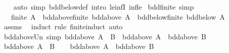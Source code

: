 \begin{isabellebody}
%
\isadelimproof
\ \ %
\endisadelimproof
%
\isatagproof
{}\isamarkupfalse%
\ {\isacharparenleft}{\kern0pt}auto\ simp{\isacharcolon}{\kern0pt}\ bdd{\isacharunderscore}{\kern0pt}below{\isacharunderscore}{\kern0pt}def\ intro{\isacharcolon}{\kern0pt}\ le{\isacharunderscore}{\kern0pt}infI{}\ inf{\isacharunderscore}{\kern0pt}le{}{\isacharparenright}{\kern0pt}%
\endisatagproof
{\isafoldproof}%
%
\isadelimproof
\isanewline
%
\endisadelimproof
\isanewline
{}\isamarkupfalse%
\ bdd{\isacharunderscore}{\kern0pt}finite\ {\isacharbrackleft}{\kern0pt}simp{\isacharbrackright}{\kern0pt}{\isacharcolon}{\kern0pt}\isanewline
\ \ \ {\isachardoublequoteopen}finite\ A{\isachardoublequoteclose}\ \ bdd{\isacharunderscore}{\kern0pt}above{\isacharunderscore}{\kern0pt}finite{\isacharcolon}{\kern0pt}\ {\isachardoublequoteopen}bdd{\isacharunderscore}{\kern0pt}above\ A{\isachardoublequoteclose}\ \ bdd{\isacharunderscore}{\kern0pt}below{\isacharunderscore}{\kern0pt}finite{\isacharcolon}{\kern0pt}\ {\isachardoublequoteopen}bdd{\isacharunderscore}{\kern0pt}below\ A{\isachardoublequoteclose}\isanewline
%
\isadelimproof
\ \ %
\endisadelimproof
%
\isatagproof
{}\isamarkupfalse%
\ assms\ \isamarkupfalse%
\ {\isacharparenleft}{\kern0pt}induct\ rule{\isacharcolon}{\kern0pt}\ finite{\isacharunderscore}{\kern0pt}induct{\isacharcomma}{\kern0pt}\ auto{\isacharparenright}{\kern0pt}%
\endisatagproof
{\isafoldproof}%
%
\isadelimproof
\isanewline
%
\endisadelimproof
\isanewline
{}\isamarkupfalse%
\ bdd{\isacharunderscore}{\kern0pt}above{\isacharunderscore}{\kern0pt}Un\ {\isacharbrackleft}{\kern0pt}simp{\isacharbrackright}{\kern0pt}{\isacharcolon}{\kern0pt}\ {\isachardoublequoteopen}bdd{\isacharunderscore}{\kern0pt}above\ {\isacharparenleft}{\kern0pt}A\ {\isasymunion}\ B{\isacharparenright}{\kern0pt}\ {\isacharequal}{\kern0pt}\ {\isacharparenleft}{\kern0pt}bdd{\isacharunderscore}{\kern0pt}above\ A\ {\isasymand}\ bdd{\isacharunderscore}{\kern0pt}above\ B{\isacharparenright}{\kern0pt}{\isachardoublequoteclose}\isanewline
%
\isadelimproof
%
\endisadelimproof
%
\isatagproof
{}\isamarkupfalse%
\isanewline
\ \ \isamarkupfalse%
\ {\isachardoublequoteopen}bdd{\isacharunderscore}{\kern0pt}above\ {\isacharparenleft}{\kern0pt}A\ {\isasymunion}\ B{\isacharparenright}{\kern0pt}{\isachardoublequoteclose}\isanewline
\ \ \isamarkupfalse%
\ {\isachardoublequoteopen}bdd{\isacharunderscore}{\kern0pt}above\ A\ {\isasymand}\ bdd{\isacharunderscore}{\kern0pt}above\ B{\isachardoublequoteclose}\ \isamarkupfalse%

\end{isabellebody}
